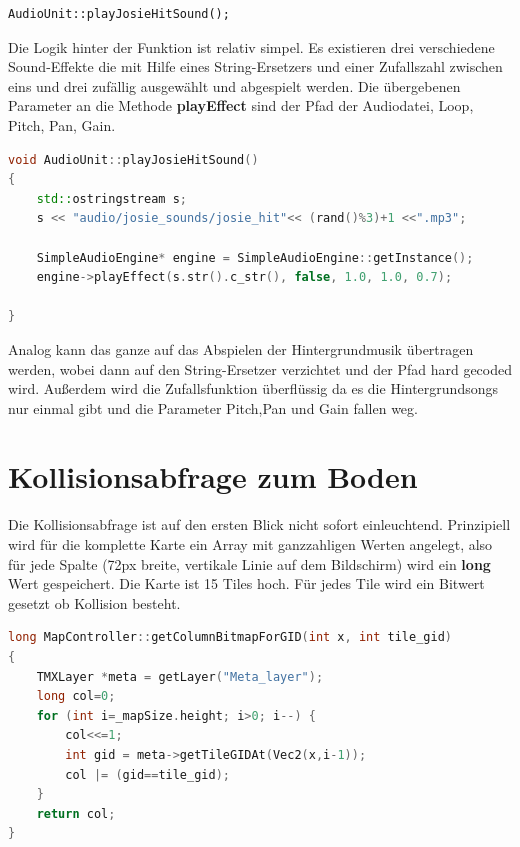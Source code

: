 \begin{lstlisting}[style=singleline]
AudioUnit::playJosieHitSound();
\end{lstlisting}

Die Logik hinter der Funktion ist relativ simpel. Es existieren drei verschiedene Sound-Effekte die mit Hilfe eines String-Ersetzers und einer Zufallszahl zwischen eins und drei zufällig ausgewählt und abgespielt werden. Die übergebenen Parameter an die Methode \textbf{playEffect} sind der Pfad der Audiodatei, Loop, Pitch, Pan, Gain.

\begin{lstlisting}[label=lst:playJosieShootSound,
				   language=C++,
				   firstnumber=30,
				   caption=BossLevel Shoot Sound abspielen ( AudioUnit.cpp )]
void AudioUnit::playJosieHitSound()
{
	std::ostringstream s;
	s << "audio/josie_sounds/josie_hit"<< (rand()%3)+1 <<".mp3";

	SimpleAudioEngine* engine = SimpleAudioEngine::getInstance();
	engine->playEffect(s.str().c_str(), false, 1.0, 1.0, 0.7);
	
}
\end{lstlisting}

Analog kann das ganze auf das Abspielen der Hintergrundmusik übertragen werden, wobei dann auf den String-Ersetzer verzichtet und der Pfad hard gecoded wird. Außerdem wird die Zufallsfunktion überflüssig da es die Hintergrundsongs nur einmal gibt und die Parameter Pitch,Pan und Gain fallen weg.



\section{Kollisionsabfrage zum Boden}\label{sec:4_Kollisionsabfrage}

Die Kollisionsabfrage ist auf den ersten Blick nicht sofort einleuchtend. Prinzipiell wird für die komplette Karte ein Array mit ganzzahligen Werten angelegt, also für jede Spalte (72px breite, vertikale Linie auf dem Bildschirm) wird ein \textbf{long} Wert gespeichert.
Die Karte ist 15 Tiles hoch. Für jedes Tile wird ein Bitwert gesetzt ob Kollision besteht.

\begin{lstlisting}[label=lst:collision_detection,
				   language=C++,
				   firstnumber=271,
				   caption=Collision Column abfragen ( MapController.cpp )]
long MapController::getColumnBitmapForGID(int x, int tile_gid)
{
	TMXLayer *meta = getLayer("Meta_layer");
	long col=0;
	for (int i=_mapSize.height; i>0; i--) {
		col<<=1;
		int gid = meta->getTileGIDAt(Vec2(x,i-1));
		col |= (gid==tile_gid);
	}
	return col;
}
\end{lstlisting}

